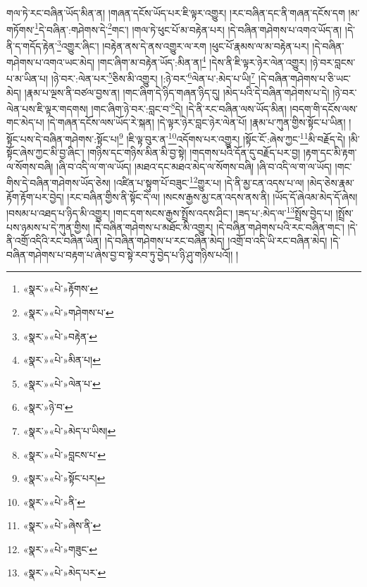 གལ་ཏེ་རང་བཞིན་ཡོད་མིན་ན། །གཞན་དངོས་ཡོད་པར་ཇི་ལྟར་འགྱུར། །རང་བཞིན་དང་ནི་གཞན་དངོས་དག །མ་གཏོགས་\footnote{«སྣར་»«པེ་»རྟོགས་}དེ་བཞིན་:གཤེགས་དེ་\footnote{«སྣར་»«པེ་»གཤེགས་པ་}གང་། །གལ་ཏེ་ཕུང་པོ་མ་བརྟེན་པར། །དེ་བཞིན་གཤེགས་པ་འགའ་ཡོད་ན། །དེ་ནི་ད་གདོད་རྟེན་\footnote{«སྣར་»«པེ་»བརྟེན་}འགྱུར་ཞིང་། །བརྟེན་ནས་དེ་ནས་འགྱུར་ལ་རག །ཕུང་པོ་རྣམས་ལ་མ་བརྟེན་པར། །དེ་བཞིན་གཤེགས་པ་འགའ་ཡང་མེད། །གང་ཞིག་མ་བརྟེན་ཡོད་:མིན་ན།\footnote{«སྣར་»«པེ་»མིན་པ།} །དེས་ནི་ཇི་ལྟར་ཉེར་ལེན་འགྱུར། །ཉེ་བར་བླངས་པ་མ་ཡིན་པ། །ཉེ་བར་:ལེན་པར་\footnote{«སྣར་»«པེ་»ལེན་པ་}ཅིས་མི་འགྱུར། །:ཉེ་བར་\footnote{«སྣར་»ཉེ་བ་}ལེན་པ་:མེད་པ་ཡི།\footnote{«སྣར་»«པེ་»མེད་པ་ཡིས།} །དེ་བཞིན་གཤེགས་པ་ཅི་ཡང་མེད། །རྣམ་པ་ལྔས་ནི་བཙལ་བྱས་ན། །གང་ཞིག་དེ་ཉིད་གཞན་ཉིད་དུ། །མེད་པའི་དེ་བཞིན་གཤེགས་པ་དེ། །ཉེ་བར་ལེན་པས་ཇི་ལྟར་གདགས། །གང་ཞིག་ཉེ་བར་:བླང་བ་\footnote{«སྣར་»«པེ་»བླངས་པ་}དེ། །དེ་ནི་རང་བཞིན་ལས་ཡོད་མིན། །བདག་གི་དངོས་ལས་གང་མེད་པ། །དེ་གཞན་དངོས་ལས་ཡོད་རེ་སྐན། །དེ་ལྟར་ཉེར་བླང་ཉེར་ལེན་པོ། །རྣམ་པ་ཀུན་གྱིས་སྟོང་པ་ཡིན། །སྟོང་པས་དེ་བཞིན་གཤེགས་:སྟོང་པ།\footnote{«སྣར་»«པེ་»སྟོང་པར།} །ཇི་ལྟ་བུར་ན་\footnote{«སྣར་»«པེ་»ནི་}འདོགས་པར་འགྱུར། །སྟོང་ངོ་:ཞེས་ཀྱང་\footnote{«སྣར་»«པེ་»ཞེས་ནི་}མི་བརྗོད་དེ། །མི་སྟོང་ཞེས་ཀྱང་མི་བྱ་ཞིང་། །གཉིས་དང་གཉིས་མིན་མི་བྱ་སྟེ། །གདགས་པའི་དོན་དུ་བརྗོད་པར་བྱ། །རྟག་དང་མི་རྟག་ལ་སོགས་བཞི། །ཞི་བ་འདི་ལ་ག་ལ་ཡོད། །མཐའ་དང་མཐའ་མེད་ལ་སོགས་བཞི། །ཞི་བ་འདི་ལ་ག་ལ་ཡོད། །གང་གིས་དེ་བཞིན་གཤེགས་ཡོད་ཅེས། །འཛིན་པ་སྟུག་པོ་བཟུང་\footnote{«སྣར་»«པེ་»གཟུང་}གྱུར་པ། །དེ་ནི་མྱ་ངན་འདས་པ་ལ། །མེད་ཅེས་རྣམ་རྟོག་རྟོག་པར་བྱེད། །རང་བཞིན་གྱིས་ནི་སྟོང་དེ་ལ། །སངས་རྒྱས་མྱ་ངན་འདས་ནས་ནི། །ཡོད་དོ་ཞེའམ་མེད་དོ་ཞེས། །བསམ་པ་འཐད་པ་ཉིད་མི་འགྱུར། །གང་དག་སངས་རྒྱས་སྤྲོས་འདས་ཤིང་། །ཟད་པ་:མེད་ལ་\footnote{«སྣར་»«པེ་»མེད་པར་}སྤྲོས་བྱེད་པ། །སྤྲོས་པས་ཉམས་པ་དེ་ཀུན་གྱིས། །དེ་བཞིན་གཤེགས་པ་མཐོང་མི་འགྱུར། །དེ་བཞིན་གཤེགས་པའི་རང་བཞིན་གང་། །དེ་ནི་འགྲོ་འདིའི་རང་བཞིན་ཡིན། །དེ་བཞིན་གཤེགས་པ་རང་བཞིན་མེད། །འགྲོ་བ་འདི་ཡི་རང་བཞིན་མེད། །དེ་བཞིན་གཤེགས་པ་བརྟག་པ་ཞེས་བྱ་བ་སྟེ་རབ་ཏུ་བྱེད་པ་ཉི་ཤུ་གཉིས་པའོ།། །
